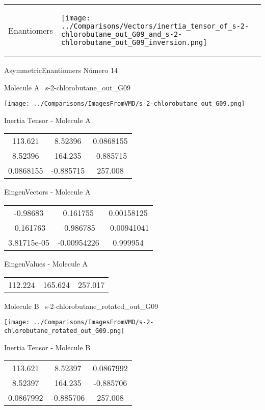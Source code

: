 \vtab[-5mm]
\begin{tabular}{*{2}{m{}}}
\begin{center}
\textcolor{NavyBlue}{\Large Enantiomers}
\end{center}
&
\begin{center}
\texttt{[image: ../Comparisons/Vectors/inertia\_tensor\_of\_s-2-chlorobutane\_out\_G09\_and\_s-2-chlorobutane\_out\_G09\_inversion.png]}
\end{center}
\end{tabular}

 \newpage

\vtab[-3cm]
\begin{center}
{\large AsymmetricEnantiomers \tab Número 14}
\end{center}
\begin{multicols}{2}
\begin{center}

Molecule A \
s-2-chlorobutane\_out\_G09

\texttt{[image: ../Comparisons/ImagesFromVMD/s-2-chlorobutane\_out\_G09.png]}

Inertia Tensor - Molecule A \\
\begin{tabular}{|c c c|}
113.621	 & 	8.52396	 & 	0.0868155	 \\
8.52396	 & 	164.235	 & 	-0.885715	 \\
0.0868155	 & 	-0.885715	 & 	257.008
\end{tabular}

\vtab
 EingenVectors - Molecule A     \\
\begin{tabular}{|c c c|}
-0.98683	 & 	0.161755	 & 	0.00158125	 \\
-0.161763	 & 	-0.986785	 & 	-0.00941041	 \\
3.81715e-05	 & 	-0.00954226	 & 	0.999954
\end{tabular}

\vtab
 EingenValues - Molecule A     \\
\begin{tabular}{|c c c|}
112.224	 & 	165.624	 & 	257.017	 \\
\end{tabular}
\columnbreak

Molecule B \
s-2-chlorobutane\_rotated\_out\_G09

\texttt{[image: ../Comparisons/ImagesFromVMD/s-2-chlorobutane\_rotated\_out\_G09.png]}

Inertia Tensor - Molecule B \\
\begin{tabular}{|c c c|}
113.621	 & 	8.52397	 & 	0.0867992	 \\
8.52397	 & 	164.235	 & 	-0.885706	 \\
0.0867992	 & 	-0.885706	 & 	257.008
\end{tabular}


\end{center}
\end{multicols}
